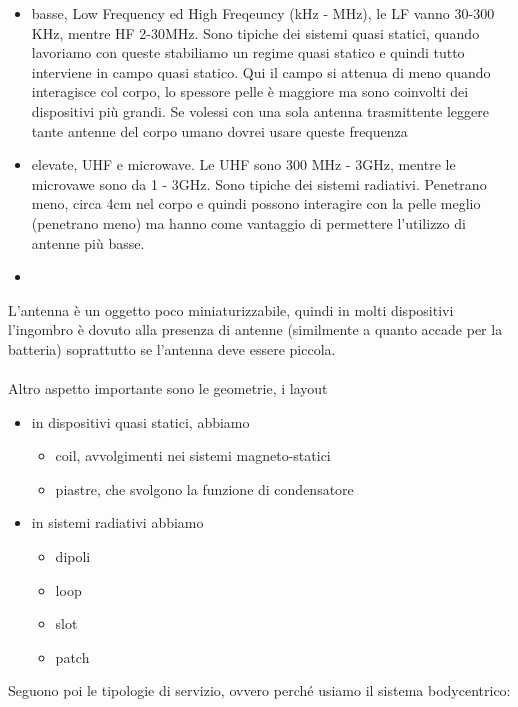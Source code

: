 \documentclass[oneside, 12pt]{extbook}
\begin{document}
\begin{itemize}
	\item basse, Low Frequency ed High Freqeuncy (kHz - MHz), le LF vanno 30-300 KHz, mentre HF 2-30MHz. Sono tipiche dei sistemi quasi statici, quando lavoriamo con queste stabiliamo un regime quasi statico e quindi tutto interviene in campo quasi statico. Qui il campo si attenua di meno quando interagisce col corpo, lo spessore pelle è maggiore ma sono coinvolti dei dispositivi più grandi. Se volessi con una sola antenna trasmittente leggere tante antenne del corpo umano dovrei usare queste frequenza
	\item elevate, UHF e microwave. Le UHF sono 300 MHz - 3GHz, mentre le microvawe sono da 1 - 3GHz.  Sono tipiche dei sistemi radiativi. Penetrano meno, circa 4cm nel corpo e quindi possono interagire con la pelle meglio (penetrano meno) ma hanno come vantaggio di permettere l'utilizzo di antenne più basse.
	\item 
\end{itemize}
L'antenna è un oggetto poco miniaturizzabile, quindi in molti dispositivi l'ingombro è dovuto alla presenza di antenne (similmente a quanto accade per la batteria) soprattutto se l'antenna deve essere piccola.\\\\Altro aspetto importante sono le geometrie, i layout
\begin{itemize}
	\item in dispositivi quasi statici, abbiamo 
	\begin{itemize}
		\item coil, avvolgimenti nei sistemi magneto-statici
		\item piastre, che svolgono la funzione di condensatore
	\end{itemize}
	\item in sistemi radiativi abbiamo
	\begin{itemize}
		\item dipoli
		\item loop
		\item slot
		\item patch
	\end{itemize}
\end{itemize}
Seguono poi le tipologie di servizio, ovvero perché usiamo il sistema bodycentrico:
\end{document}
